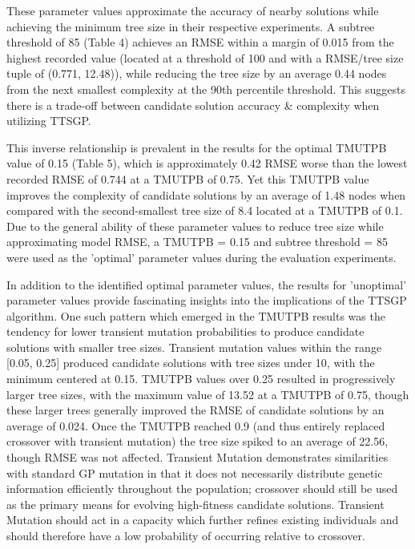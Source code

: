 \documentclass[a4paper, twocolumn]{article}
\begin{document}
These parameter values approximate the accuracy of nearby solutions while achieving the minimum tree size in their respective experiments. A subtree threshold of 85 (Table 4) achieves an RMSE within a margin of 0.015 from the highest recorded value (located at a threshold of 100 and with a RMSE/tree size tuple of (0.771, 12.48)), while reducing the tree size by an average 0.44 nodes from the next smallest complexity at the 90th percentile threshold. This suggests there is a trade-off between candidate solution accuracy \& complexity when utilizing TTSGP. 

This inverse relationship is prevalent in the results for the optimal TMUTPB value of 0.15 (Table 5), which is approximately 0.42 RMSE worse than the lowest recorded RMSE of 0.744 at a TMUTPB of 0.75. Yet this TMUTPB value improves the complexity of candidate solutions by an average of 1.48 nodes when compared with the second-smallest tree size of 8.4 located at a TMUTPB of 0.1. Due to the general ability of these parameter values to reduce tree size while approximating model RMSE, a TMUTPB = 0.15 and subtree threshold = 85 were used as the 'optimal' parameter values during the evaluation experiments.

In addition to the identified optimal parameter values, the results for 'unoptimal' parameter values provide fascinating insights into the implications of the TTSGP algorithm. One such pattern which emerged in the TMUTPB results was the tendency for lower transient mutation probabilities to produce candidate solutions with smaller tree sizes. Transient mutation values within the range [0.05, 0.25] produced candidate solutions with tree sizes under 10, with the minimum centered at 0.15. TMUTPB values over 0.25 resulted in progressively larger tree sizes, with the maximum value of 13.52 at a TMUTPB of 0.75, though these larger trees generally improved the RMSE of candidate solutions by an average of 0.024. Once the TMUTPB reached 0.9 (and thus entirely replaced crossover with transient mutation) the tree size spiked to an average of 22.56, though RMSE was not affected. Transient Mutation demonstrates similarities with standard GP mutation in that it does not necessarily distribute genetic information efficiently throughout the population; crossover should still be used as the primary means for evolving high-fitness candidate solutions. Transient Mutation should act in a capacity which further refines existing individuals and should therefore have a low probability of occurring relative to crossover.
\end{document}
